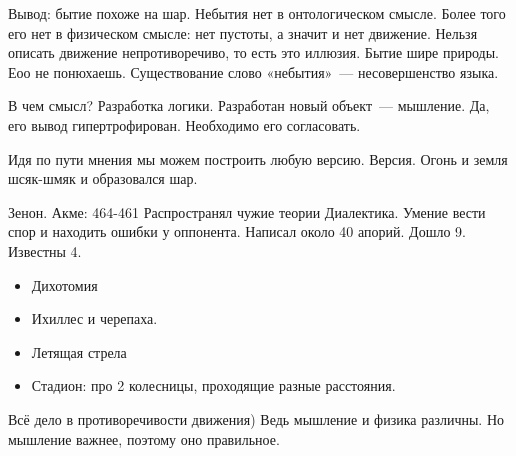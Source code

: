 Вывод: бытие похоже на шар. 
Небытия нет в онтологическом смысле. Более того его нет в физическом смысле: нет пустоты, а значит и нет движение. Нельзя описать движение непротиворечиво, то есть это иллюзия. 
Бытие шире природы. Еоо не понюхаешь. 
Существование слово «небытия»~--- несовершенство языка. 

В чем смысл? Разработка логики. Разработан новый объект~--- мышление. Да, его вывод гипертрофирован. Необходимо его согласовать. 

Идя по пути мнения мы можем построить любую версию. 
Версия. Огонь и земля шсяк-шмяк и образовался шар. 

Зенон. Акме: 464-461 
Распространял чужие теории
Диалектика. Умение вести спор и находить ошибки у оппонента. Написал около 40 апорий. Дошло 9. Известны 4. 

\begin{itemize}
	\item Дихотомия
	\item Ихиллес и черепаха. 
	\item Летящая стрела
	\item Стадион: про 2 колесницы, проходящие разные расстояния. 
\end{itemize}

Всё дело в противоречивости движения) Ведь мышление и физика различны. Но мышление важнее, поэтому оно правильное. 
